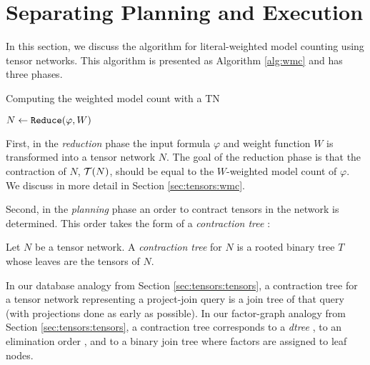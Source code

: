 \section{Separating Planning and Execution}
\label{sec:tensors:algorithm}
In this section, we discuss the algorithm for literal-weighted model counting using tensor networks. This algorithm is presented as Algorithm \ref{alg:wmc} and has three phases.

\begin{algorithm*}[t]
    \label{alg:wmc}
    \caption{Computing the weighted model count with a TN}
    \DontPrintSemicolon
    $N \gets \texttt{\upshape Reduce}(\varphi, W)$\;
\end{algorithm*}

First, in the \emph{reduction} phase the input formula $\varphi$ and weight function $W$ is transformed into a tensor network $N$. The goal of the reduction phase is that the contraction of $N$, $\mathcal{T}(N)$, should be equal to the $W$-weighted model count of $\varphi$. We discuss in more detail in Section \ref{sec:tensors:wmc}.

Second, in the \emph{planning} phase an order to contract tensors in the network is determined.
This order takes the form of a \emph{contraction tree} \cite{EP14}:
\begin{definition} \label{def:contraction-tree}
	Let $N$ be a tensor network. A \emph{contraction tree} for $N$ is a rooted binary tree $T$ whose leaves are the tensors of $N$. %
\end{definition}

In our database analogy from Section \ref{sec:tensors:tensors}, a contraction tree for a tensor network representing a project-join query is a join tree of that query (with projections done as early as possible). 
In our factor-graph analogy from Section \ref{sec:tensors:tensors}, a contraction tree corresponds to a \emph{dtree} \cite{darwiche01}, to an elimination order \cite{darwiche01b}, and to a binary join tree \cite{shenoy97} where factors are assigned to leaf nodes.

